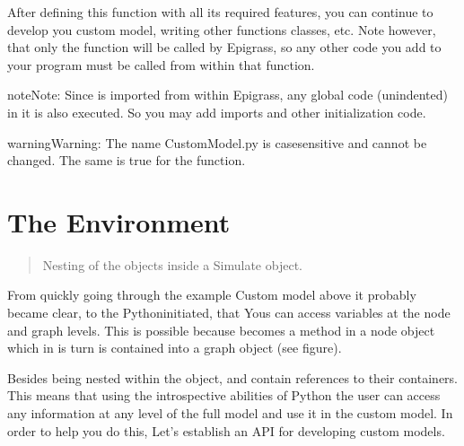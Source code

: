 \documentclass[letterpaper,10pt,english]{sphinxmanual}
\begin{document}
After defining this function with all its required features, you can continue to develop you custom model, writing other functions classes, etc. Note however, that only the  function will be called by Epigrass, so any other code you add to your program must be called from within that function.

\begin{sphinxadmonition}{note}{Note:}
Since  is imported from within Epigrass, any global code (unindented) in it is also  executed. So you may add imports and other initialization code.
\end{sphinxadmonition}

\begin{sphinxadmonition}{warning}{Warning:}
The name CustomModel.py is case\sphinxhyphen{}sensitive and cannot be changed. The same is true for the  function.
\end{sphinxadmonition}


\section{The Environment}
\label{\detokenize{scripting:the-environment}}\begin{quote}

Nesting of the objects inside a Simulate object.
\end{quote}

From quickly going through the example Custom model above it probably became clear, to the Python\sphinxhyphen{}initiated, that Yous can access variables at the node and graph levels.  This is possible because  becomes a method in a node object which in is turn is contained into a graph object (see figure).

Besides being nested within the  object,  and  contain references to their containers. This means that using the introspective abilities of Python the user can access any information at any level of the full  model and use it in the custom model. In order to help you do this, Let’s establish an API for developing custom models.
\end{document}

